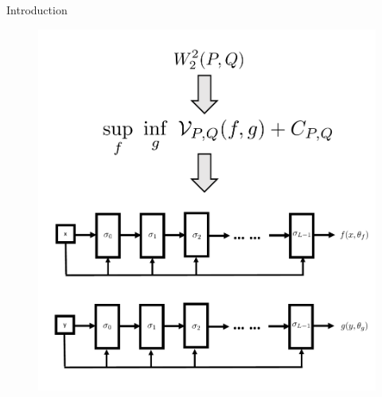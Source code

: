 \documentclass{beamer}		%
\begin{document}







\begin{frame}{Introduction}


\begin{figure}[t]
\centerline{\includegraphics[width=0.6\linewidth]{figure2.pdf}}
\vspace{-10pt}

\label{fig1}
\end{figure}


\end{frame}
\end{document}
